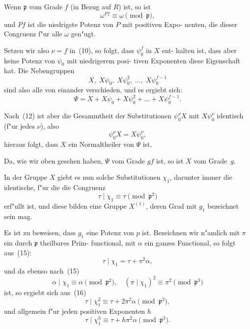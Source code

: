 \documentclass[12pt,a4paper]{article}
\theoremstyle{weber}
\begin{document}
Wenn $\mathfrak{p}$ vom Grade $f$ (in Bezug auf $R$) ist, so ist
\[
\omega^{Pf} \equiv \omega \pmod{\mathfrak{p}},
\]
und $Pf$ ist die niedrigste Potenz von $P$ mit positiven Expo-
nenten, die dieser Congruenz f"ur alle $\omega$ gen"ugt.

Setzen wir also $\nu = f$ in~(10), so folgt, dass $\psi_0^f$ in $X$ ent-
halten ist, dass aber keine Potenz von $\psi_0$ mit niedrigerem posi-
tiven Exponenten diese Eigenschaft hat. Die Nebengruppen
\[
X,\; X\psi_0,\; X\psi_0^2,\; \dots,\; X\psi_0^{f-1}
\]
sind also alle von einander verschieden, und es ergiebt sich:
\begin{equation}\label{eq:s162-13}
\varPsi = X + X\psi_0 + X\psi_0^2 + \dots + X\psi_0^{f-1}.
\end{equation}

Nach~(12) ist aber die Gesammtheit der Substitutionen $\psi_0^\nu X$
mit $X\psi_0^\nu$ identisch (f"ur jedes $\nu$), also
\begin{equation}\label{eq:s162-14}
\psi_0^\nu X = X\psi_0^\nu,
\end{equation}
hieraus folgt, dass $X$ ein Normaltheiler von $\varPsi$ ist.

Da, wie wir oben gesehen haben, $\varPsi$ vom Grade $gf$
ist, so ist $X$ vom Grade~$g$.

In der Gruppe $X$ giebt es nun solche Substitutionen $\chi_1$,
darunter immer die identische, f"ur die die Congruenz
\begin{equation}\label{eq:s162-15}
\tau \mid \chi_1 \equiv \tau \pmod{\mathfrak{p}^2}
\end{equation}
erf"ullt ist, und diese bilden eine Gruppe $X^{(1)}$, deren Grad mit $g_1$
bezeichnet sein mag.

Es ist zu beweisen, dass $g_1$ eine Potenz von $p$ ist.
Bezeichnen wir n"amlich mit $\pi$ ein durch $\mathfrak{p}$ theilbares Prim-
functional, mit $\alpha$ ein ganzes Functional, so folgt aus~(15):
\begin{equation}\label{eq:s162-16}
\tau \mid \chi_1 = \tau + \pi^2\alpha,
\end{equation}
und da ebenso nach~(15)
\[
\alpha \mid \chi_1 \equiv \alpha \pmod{\mathfrak{p}^2}, \quad (\pi \mid \chi_1)^2 \equiv \pi^2 \pmod{\mathfrak{p}^3}
\]
ist, so ergiebt sich aus~(16)
\[
\tau \mid \chi_1^2 \equiv \tau + 2\pi^2\alpha \pmod{\mathfrak{p}^3},
\]
und allgemein f"ur jeden positiven Exponenten $h$
\[
\tau \mid \chi_1^h \equiv \tau + h\pi^2\alpha \pmod{\mathfrak{p}^3}.
\]
\end{document}
